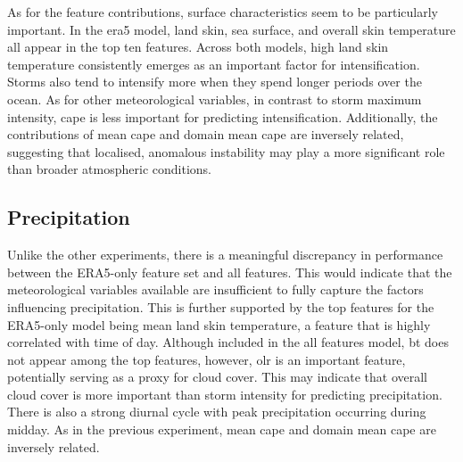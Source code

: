 As for the feature contributions, surface characteristics seem to be particularly important. In the \acrshort{era5} model, land skin, sea surface, and overall skin temperature all appear in the top ten features. Across both models, high land skin temperature consistently emerges as an important factor for intensification. Storms also tend to intensify more when they spend longer periods over the ocean. As for other meteorological variables, in contrast to storm maximum intensity, \acrshort{cape} is less important for predicting intensification. Additionally, the contributions of mean \acrshort{cape} and domain mean \acrshort{cape} are inversely related, suggesting that localised, anomalous instability may play a more significant role than broader atmospheric conditions.


\clearpage
\subsection{Precipitation}

Unlike the other experiments, there is a meaningful discrepancy in performance between the ERA5-only feature set and all features. This would indicate that the meteorological variables available are insufficient to fully capture the factors influencing precipitation. This is further supported by the top features for the ERA5-only model being mean land skin temperature, a feature that is highly correlated with time of day. Although included in the all features model, \acrfull{bt} does not appear among the top features, however, \acrfull{olr} is an important feature, potentially serving as a proxy for cloud cover. This may indicate that overall cloud cover is more important than storm intensity for predicting precipitation. There is also a strong diurnal cycle with peak precipitation occurring during midday. As in the previous experiment, mean \acrshort{cape} and domain mean \acrshort{cape} are inversely related.

